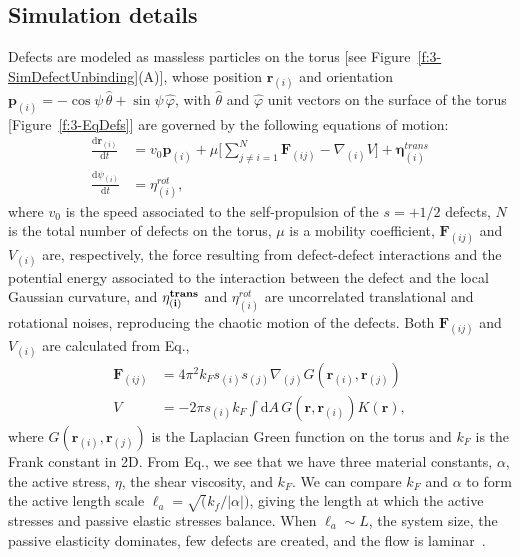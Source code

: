 \subsection{Simulation details}
Defects are modeled as massless particles on the torus [see Figure~\ref{f:3-SimDefectUnbinding}(A)], whose position $\mathbf{r}_{(i)}$ and orientation $\mathbf{p}_{(i)} = -\cos \psi \, \hat{\theta} + \sin \psi \, \hat{\varphi}$, with $\hat{\theta}$ and $\hat{\varphi}$ unit vectors on the surface of the torus [Figure~\ref{f:3-EqDefs}] are governed by the following equations of motion:
\label{e:3-EoM}
\begin{align}
  \frac{\textrm{d}\mathbf{r}_{(i)}}{\textrm{d}t} &= v_0 \mathbf{p}_{(i)} + \mu \Big [\sum\limits_{j\neq i=1}^N \mathbf{F}_{(ij)} - \nabla_{(i)} V \Big ] + \bm{\eta}^{trans}_{(i)}\tag{\theequation a} \\
    \frac{\textrm{d}\psi_{(i)}}{\textrm{d}t} &= \eta^{rot}_{(i)},\tag{\theequation b}
\end{align}
where $v_0$ is the speed associated to the self-propulsion of the $s = +1/2$ defects, $N$ is the total number of defects on the torus, $\mu$ is a mobility coefficient, $\mathbf{F}_{(ij)}$ and $V_{(i)}$ are, respectively, the force resulting from defect-defect interactions and the potential energy associated to the interaction between the defect and the local Gaussian curvature, and $\bf{\eta}^{trans}_{(i)}$ and $\eta^{rot}_{(i)}$ are uncorrelated translational and rotational noises, reproducing the chaotic motion of the defects.
Both $\mathbf{F}_{(ij)}$ and $V_{(i)}$ are calculated from Eq.,
\begin{align}
  \mathbf{F}_{(ij)} &= 4\pi^2 k_F s_{(i)}s_{(j)} \nabla_{(j)} G(\mathbf{r}_{(i)},\mathbf{r}_{(j)})\tag{\theequation a} \\
  V &= - 2 \pi s_{(i)}k_F \int \textrm{d}A\, G(\mathbf{r},\mathbf{r}_{(i)})K(\mathbf{r}),\tag{\theequation b}
\end{align}
where $G(\mathbf{r}_{(i)},\mathbf{r}_{(j)})$ is the Laplacian Green function on the torus and $k_F$ is the Frank constant in 2D.
From Eq., we see that we have three material constants, $\alpha$, the active stress, $\eta$, the shear viscosity, and $k_F$.
We can compare $k_F$ and $\alpha$ to form the active length scale $\ell_a = \sqrt(k_f / |\alpha|)$, giving the length at which the active stresses and passive elastic stresses balance.
When $\ell_a \sim L$, the system size, the passive elasticity dominates, few defects are created, and the flow is laminar~\cite{RN7}.
